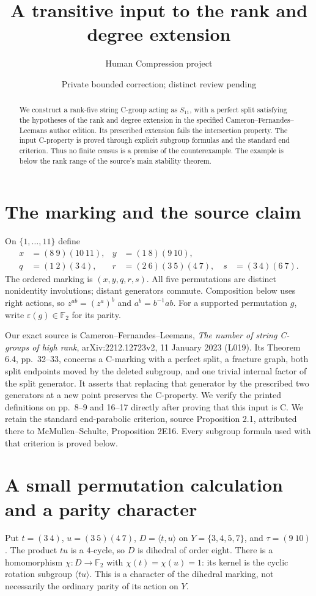 \documentclass[11pt,a4paper]{article}
\title{A transitive input to the rank and degree extension}
\author{Human Compression project}\date{Private bounded correction; distinct review pending}
\newcommand{\gen}[1]{\langle#1\rangle}\newcommand{\eps}{\varepsilon}
\begin{document}
\maketitle
\begin{abstract}
We construct a rank-five string C-group acting as $S_{11}$, with a perfect
split satisfying the hypotheses of the rank and degree extension in the
specified Cameron--Fernandes--Leemans author edition. Its prescribed extension
fails the intersection property. The input C-property is proved through
explicit subgroup formulas and the standard end criterion. Thus no finite
census is a premise of the counterexample. The example is below the rank
range of the source's main stability theorem.
\end{abstract}

\section{The marking and the source claim}
On $\{1,\ldots,11\}$ define
\[
\begin{aligned}
 x&=(8\ 9)(10\ 11),&y&=(1\ 8)(9\ 10),\\
 q&=(1\ 2)(3\ 4),&r&=(2\ 6)(3\ 5)(4\ 7),
\quad s&=(3\ 4)(6\ 7).
\end{aligned}
\]
The ordered marking is $(x,y,q,r,s)$. All five permutations are distinct
nonidentity involutions; distant generators commute. Composition below uses
right actions, so $z^{ab}=(z^a)^b$ and $a^b=b^{-1}ab$.
For a supported permutation $g$, write $\eps(g)\in\mathbb F_2$ for its parity.

Our exact source is Cameron--Fernandes--Leemans,
\emph{The number of string C-groups of high rank},
arXiv:2212.12723v2, 11 January 2023 (L019).
Its Theorem 6.4, pp.~32--33, concerns a C-marking with a perfect split,
a fracture graph, both split endpoints moved by the deleted subgroup,
and one trivial internal factor of the split generator.
It asserts that replacing that generator by the prescribed two generators
at a new point preserves the C-property. We verify the printed definitions
on pp.~8--9 and 16--17 directly after proving that this input is C.
We retain the standard end-parabolic criterion, source Proposition 2.1,
attributed there to McMullen--Schulte, Proposition 2E16. Every subgroup
formula used with that criterion is proved below.

\section{A small permutation calculation and a parity character}
Put $t=(3\ 4)$, $u=(3\ 5)(4\ 7)$, $D=\gen{t,u}$ on
$Y=\{3,4,5,7\}$, and $\tau=(9\ 10)$.
The product $tu$ is a $4$-cycle, so $D$ is dihedral of order eight.
There is a homomorphism
$\chi:D\longrightarrow\mathbb F_2$ with $\chi(t)=\chi(u)=1$:
its kernel is the cyclic rotation subgroup $\gen{tu}$.
This is a character of the dihedral marking, not necessarily the ordinary
parity of its action on $Y$.
\end{document}
